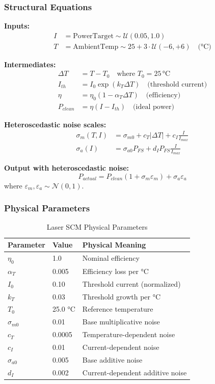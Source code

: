 \documentclass[11pt,a4paper]{article}
\begin{document}
\subsubsection{Structural Equations}

\textbf{Inputs:}
\begin{align}
I &= \text{PowerTarget} \sim \mathcal{U}(0.05, 1.0) \\
T &= \text{AmbientTemp} \sim 25 + 3 \cdot \mathcal{U}(-6, +6) \quad \text{(°C)}
\end{align}

\textbf{Intermediates:}
\begin{align}
\Delta T &= T - T_0 \quad \text{where } T_0 = 25\,°\text{C} \\
I_{th} &= I_0 \exp(k_T \Delta T) \quad \text{(threshold current)} \\
\eta &= \eta_0 (1 - \alpha_T \Delta T) \quad \text{(efficiency)} \\
P_{clean} &= \eta (I - I_{th}) \quad \text{(ideal power)}
\end{align}

\textbf{Heteroscedastic noise scales:}
\begin{align}
\sigma_m(T, I) &= \sigma_{m0} + c_T |\Delta T| + c_I \frac{I}{I_{max}} \\
\sigma_a(I) &= \sigma_{a0} P_{FS} + d_I P_{FS} \frac{I}{I_{max}}
\end{align}

\textbf{Output with heteroscedastic noise:}
\begin{equation}
P_{actual} = P_{clean} (1 + \sigma_m \varepsilon_m) + \sigma_a \varepsilon_a
\end{equation}
where $\varepsilon_m, \varepsilon_a \sim \mathcal{N}(0, 1)$.

\subsubsection{Physical Parameters}

\begin{table}[h]
\centering
\begin{tabular}{@{}lll@{}}
\toprule
Parameter & Value & Physical Meaning \\
\midrule
$\eta_0$ & 1.0 & Nominal efficiency \\
$\alpha_T$ & 0.005 & Efficiency loss per °C \\
$I_0$ & 0.10 & Threshold current (normalized) \\
$k_T$ & 0.03 & Threshold growth per °C \\
$T_0$ & 25.0 °C & Reference temperature \\
$\sigma_{m0}$ & 0.01 & Base multiplicative noise \\
$c_T$ & 0.0005 & Temperature-dependent noise \\
$c_I$ & 0.01 & Current-dependent noise \\
$\sigma_{a0}$ & 0.005 & Base additive noise \\
$d_I$ & 0.002 & Current-dependent additive noise \\
\bottomrule
\end{tabular}
\caption{Laser SCM Physical Parameters}
\end{table}
\end{document}
